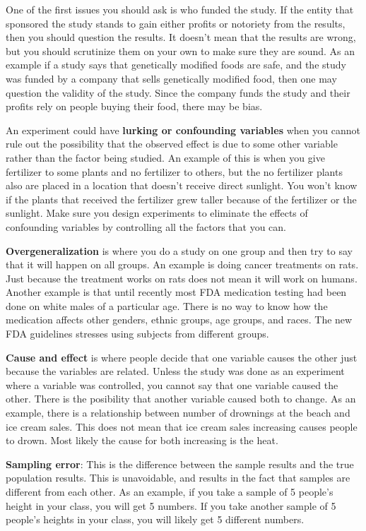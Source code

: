 \documentclass[
]{book}
\begin{document}
One of the first issues you should ask is who funded the study. If the entity that sponsored the study stands to gain either profits or notoriety from the results, then you should question the results. It doesn't mean that the results are wrong, but you should scrutinize them on your own to make sure they are sound. As an example if a study says that genetically modified foods are safe, and the study was funded by a company that sells genetically modified food, then one may question the validity of the study. Since the company funds the study and their profits rely on people buying their food, there may be bias.

An experiment could have \textbf{lurking or confounding variables} when you cannot rule out the possibility that the observed effect is due to some other variable rather than the factor being studied. An example of this is when you give fertilizer to some plants and no fertilizer to others, but the no fertilizer plants also are placed in a location that doesn't receive direct sunlight. You won't know if the plants that received the fertilizer grew taller because of the fertilizer or the sunlight. Make sure you design experiments to eliminate the effects of confounding variables by controlling all the factors that you can.

\textbf{Overgeneralization} is where you do a study on one group and then try to say that it will happen on all groups. An example is doing cancer treatments on rats. Just because the treatment works on rats does not mean it will work on humans. Another example is that until recently most FDA medication testing had been done on white males of a particular age. There is no way to know how the medication affects other genders, ethnic groups, age groups, and races. The new FDA guidelines stresses using subjects from different groups.

\textbf{Cause and effect} is where people decide that one variable causes the other just because the variables are related. Unless the study was done as an experiment where a variable was controlled, you cannot say that one variable caused the other. There is the posibility that another variable caused both to change. As an example, there is a relationship between number of drownings at the beach and ice cream sales. This does not mean that ice cream sales increasing causes people to drown. Most likely the cause for both increasing is the heat.

\textbf{Sampling error}: This is the difference between the sample results and the true population results. This is unavoidable, and results in the fact that samples are different from each other. As an example, if you take a sample of 5 people's height in your class, you will get 5 numbers. If you take another sample of 5 people's heights in your class, you will likely get 5 different numbers.
\end{document}

